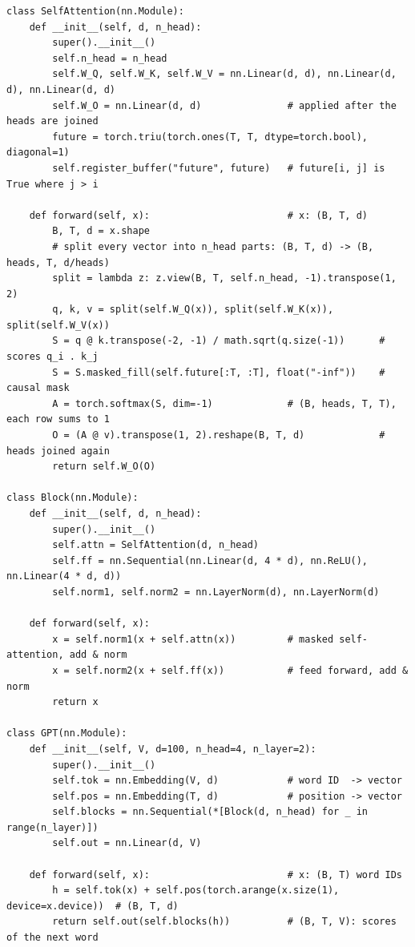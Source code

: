 \documentclass[11pt,a4paper]{article}
\begin{document}
\begin{lstlisting}
class SelfAttention(nn.Module):
    def __init__(self, d, n_head):
        super().__init__()
        self.n_head = n_head
        self.W_Q, self.W_K, self.W_V = nn.Linear(d, d), nn.Linear(d, d), nn.Linear(d, d)
        self.W_O = nn.Linear(d, d)               # applied after the heads are joined
        future = torch.triu(torch.ones(T, T, dtype=torch.bool), diagonal=1)
        self.register_buffer("future", future)   # future[i, j] is True where j > i

    def forward(self, x):                        # x: (B, T, d)
        B, T, d = x.shape
        # split every vector into n_head parts: (B, T, d) -> (B, heads, T, d/heads)
        split = lambda z: z.view(B, T, self.n_head, -1).transpose(1, 2)
        q, k, v = split(self.W_Q(x)), split(self.W_K(x)), split(self.W_V(x))
        S = q @ k.transpose(-2, -1) / math.sqrt(q.size(-1))      # scores q_i . k_j
        S = S.masked_fill(self.future[:T, :T], float("-inf"))    # causal mask
        A = torch.softmax(S, dim=-1)             # (B, heads, T, T), each row sums to 1
        O = (A @ v).transpose(1, 2).reshape(B, T, d)             # heads joined again
        return self.W_O(O)

class Block(nn.Module):
    def __init__(self, d, n_head):
        super().__init__()
        self.attn = SelfAttention(d, n_head)
        self.ff = nn.Sequential(nn.Linear(d, 4 * d), nn.ReLU(), nn.Linear(4 * d, d))
        self.norm1, self.norm2 = nn.LayerNorm(d), nn.LayerNorm(d)

    def forward(self, x):
        x = self.norm1(x + self.attn(x))         # masked self-attention, add & norm
        x = self.norm2(x + self.ff(x))           # feed forward, add & norm
        return x

class GPT(nn.Module):
    def __init__(self, V, d=100, n_head=4, n_layer=2):
        super().__init__()
        self.tok = nn.Embedding(V, d)            # word ID  -> vector
        self.pos = nn.Embedding(T, d)            # position -> vector
        self.blocks = nn.Sequential(*[Block(d, n_head) for _ in range(n_layer)])
        self.out = nn.Linear(d, V)

    def forward(self, x):                        # x: (B, T) word IDs
        h = self.tok(x) + self.pos(torch.arange(x.size(1), device=x.device))  # (B, T, d)
        return self.out(self.blocks(h))          # (B, T, V): scores of the next word
\end{lstlisting}
\end{document}

